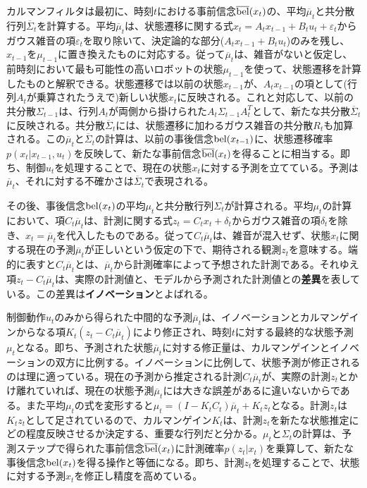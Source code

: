 \documentclass[dvipdfmx,a4paper]{jsarticle}
\begin{document}
カルマンフィルタは最初に、時刻$t$における事前信念$\operatorname{\overline{bel}}(x_t)$の、平均$\overline{\mu}_t$と共分散行列$\overline{\Sigma}_t$を計算する。平均$\overline{\mu}_t$は、状態遷移に関する式$x_t = A_t x_{t - 1} + B_t u_t + \varepsilon_t$からガウス雑音の項$\varepsilon_t$を取り除いて、決定論的な部分($A_t x_{t - 1} + B_t u_t$)のみを残し、$x_{t - 1}$を$\mu_{t - 1}$に置き換えたものに対応する。従って$\overline{\mu}_t$は、雑音がないと仮定し、前時刻において最も可能性の高いロボットの状態$\mu_{t - 1}$を使って、状態遷移を計算したものと解釈できる。状態遷移では以前の状態$x_{t - 1}$が、$A_t x_{t - 1}$の項として(行列$A_t$が乗算されたうえで)新しい状態$x_t$に反映される。これと対応して、以前の共分散$\Sigma_{t - 1}$は、行列$A_t$が両側から掛けられた$A_t \Sigma_{t - 1} A_t^T$として、新たな共分散$\overline{\Sigma}_t$に反映される。共分散$\overline{\Sigma}_t$には、状態遷移に加わるガウス雑音の共分散$R_t$も加算される。この$\overline{\mu}_t$と$\overline{\Sigma}_t$の計算は、以前の事後信念$\operatorname{bel}(x_{t - 1})$に、状態遷移確率$p(x_t | x_{t - 1}, u_t)$を反映して、新たな事前信念$\operatorname{\overline{bel}}(x_t)$を得ることに相当する。即ち、制御$u_t$を処理することで、現在の状態$x_t$に対する予測を立てている。予測は$\overline{\mu}_t$、それに対する不確かさは$\overline{\Sigma}_t$で表現される。\newline

その後、事後信念$\operatorname{bel}(x_t)$の平均$\mu_t$と共分散行列$\Sigma_t$が計算される。平均$\mu_t$の計算において、項$C_t \overline{\mu}_t$は、計測に関する式$z_t = C_t x_t + \delta_t$からガウス雑音の項$\delta_t$を除き、$x_t = \overline{\mu}_t$を代入したものである。従って$C_t \overline{\mu}_t$は、雑音が混入せず、状態$x_t$に関する現在の予測$\overline{\mu}_t$が正しいという仮定の下で、期待される観測$z_t$を意味する。端的に表すと$C_t \overline{\mu}_t$とは、$\overline{\mu}_t$から計測確率によって予想された計測である。それゆえ項$z_t - C_t \overline{\mu}_t$は、実際の計測値と、モデルから予測された計測値との\textbf{差異}を表している。この差異は\textbf{イノベーション}とよばれる。\newline

制御動作$u_t$のみから得られた中間的な予測$\overline{\mu}_t$は、イノベーションとカルマンゲインからなる項$K_t \left( z_t - C_t \overline{\mu}_t \right)$により修正され、時刻$t$に対する最終的な状態予測$\mu_t$となる。即ち、予測された状態$\overline{\mu}_t$に対する修正量は、カルマンゲインとイノベーションの双方に比例する。イノベーションに比例して、状態予測が修正されるのは理に適っている。現在の予測から推定される計測$C_t \overline{\mu}_t$が、実際の計測$z_t$とかけ離れていれば、現在の状態予測$\overline{\mu}_t$には大きな誤差があるに違いないからである。また平均$\mu_t$の式を変形すると$\mu_t = \left( I - K_t C_t \right) \overline{\mu}_t + K_t z_t$となる。計測$z_t$は$K_t z_t$として足されているので、カルマンゲイン$K_t$は、計測$z_t$を新たな状態推定にどの程度反映させるか決定する、重要な行列だと分かる。$\mu_t$と$\Sigma_t$の計算は、予測ステップで得られた事前信念$\operatorname{\overline{bel}}(x_t)$に計測確率$p(z_t | x_t)$を乗算して、新たな事後信念$\operatorname{bel}(x_t)$を得る操作と等価になる。即ち、計測$z_t$を処理することで、状態に対する予測$x_t$を修正し精度を高めている。\newline
\end{document}
